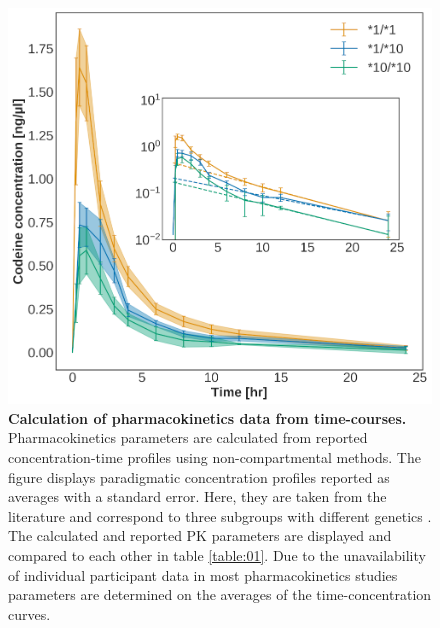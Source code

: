 \documentclass[a4,center,fleqn]{NAR}
\begin{document}
\begin{figure}[t]
\begin{center}
\includegraphics{NAR-fig2.png}
\end{center}
\caption{\textbf{Calculation of pharmacokinetics data from time-courses.} \newline
Pharmacokinetics parameters are calculated from reported concentration-time profiles using non-compartmental methods. The figure displays paradigmatic concentration profiles reported as averages with a standard error. Here, they are taken from the literature and correspond to three subgroups with different genetics \cite{Wu2014}. The calculated and reported PK parameters are displayed and compared to each other in table \ref{table:01}. Due to the unavailability of individual participant data in most pharmacokinetics studies parameters are determined on the averages of the time-concentration curves.
}
\label{NAR-fig2}
\end{figure}
\end{document}
